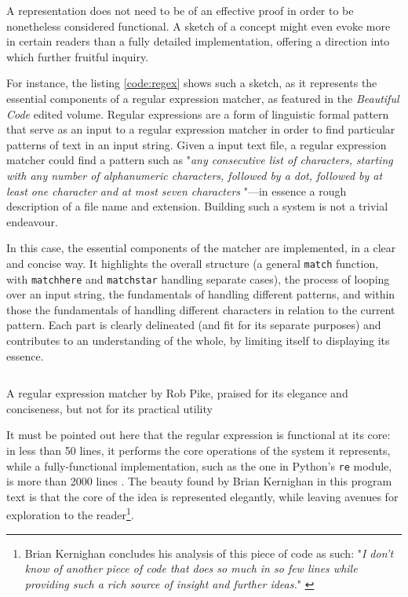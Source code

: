 A representation does not need to be of an effective proof in order to be nonetheless considered functional. A sketch of a concept might even evoke more in certain readers than a fully detailed implementation, offering a direction into which further fruitful inquiry.

For instance, the listing \ref{code:regex} shows such a sketch, as it represents the essential components of a regular expression matcher, as featured in the \emph{Beautiful Code} edited volume. Regular expressions are a form of linguistic formal pattern that serve as an input to a regular expression matcher in order to find particular patterns of text in an input string. Given a input text file, a regular expression matcher could find a pattern such as "\emph{any consecutive list of characters, starting with any number of alphanumeric characters, followed by a dot, followed by at least one character and at most seven characters }"—in essence a rough description of a file name and extension. Building such a system is not a trivial endeavour.

In this case, the essential components of the matcher are implemented, in a clear and concise way. It highlights the overall structure (a general \lstinline{match} function, with \lstinline{matchhere} and \lstinline{matchstar} handling separate cases), the process of looping over an input string, the fundamentals of handling different patterns, and within those the fundamentals of handling different characters in relation to the current pattern. Each part is clearly delineated (and fit for its separate purposes) and contributes to an understanding of the whole, by limiting itself to displaying its essence.

\begin{listing}
    \inputminted{c}{./corpus/regex.c}
    \caption{A regular expression matcher by Rob Pike, praised for its elegance and conciseness, but not for its practical utility \citep{oram_beautiful_2007}}
    \label{code:regex}
\end{listing}

It must be pointed out here that the regular expression is functional at its core: in less than 50 lines, it performs the core operations of the system it represents, while a fully-functional implementation, such as the one in Python's \lstinline{re} module, is more than 2000 lines \citep{secretlabsab_parser_2001}. The beauty found by Brian Kernighan in this program text is that the core of the idea is represented elegantly, while leaving avenues for exploration to the reader\footnote{Brian Kernighan concludes his analysis of this piece of code as such: "\emph{I don’t know of another piece of code that does so much in so few lines while providing such a rich source of insight and further ideas.}" \citep{kernighan_regular_2007}}.

